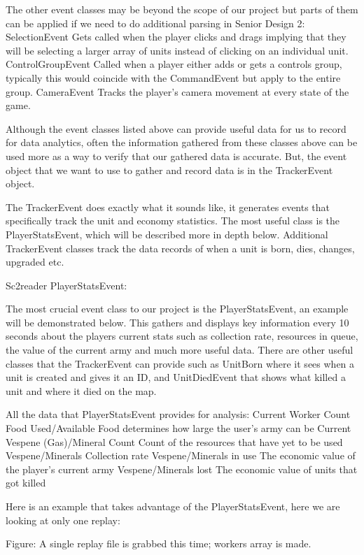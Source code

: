 \documentclass[a4paper,12pt]{report}
\begin{document}
The other event classes may be beyond the scope of our project but parts of them can be applied if we need to do additional parsing in Senior Design 2:
SelectionEvent
Gets called when the player clicks and drags implying that they will be selecting a larger array of units instead of clicking on an individual unit. 
ControlGroupEvent
Called when a player either adds or gets a controls group, typically this would coincide with the CommandEvent but apply to the entire group.
CameraEvent
Tracks the player's camera movement at every state of the game. 

Although the event classes listed above can provide useful data for us to record for data analytics, often the information gathered from these classes above can be used more as a way to verify that our gathered data is accurate. But, the event object that we want to use to gather and record data is in the TrackerEvent object.

The TrackerEvent does exactly what it sounds like, it generates events that specifically track the unit and economy statistics. The most useful class is the PlayerStatsEvent, which will be described more in depth below. Additional TrackerEvent classes track the data records of when a unit is born, dies, changes, upgraded etc.


Sc2reader PlayerStatsEvent:

The most crucial event class to our project is the PlayerStatsEvent, an example will be demonstrated below. This gathers and displays key information every 10 seconds about the players current stats such as collection rate, resources in queue, the value of the current army and much more useful data. There are other useful classes that the TrackerEvent can provide such as UnitBorn where it sees when a unit is created and gives it an ID, and UnitDiedEvent that shows what killed a unit and where it died on the map.

All the data that PlayerStatsEvent provides for analysis:
Current Worker Count
Food Used/Available
Food determines how large the user’s army can be
Current Vespene (Gas)/Mineral Count
Count of the resources that have yet to be used
Vespene/Minerals Collection rate
Vespene/Minerals in use
The economic value of the player’s current army
Vespene/Minerals lost
The economic value of units that got killed

Here is an example that takes advantage of the PlayerStatsEvent, here we are looking at only one replay:

Figure: A single replay file is grabbed this time; workers array is made.
\end{document}
